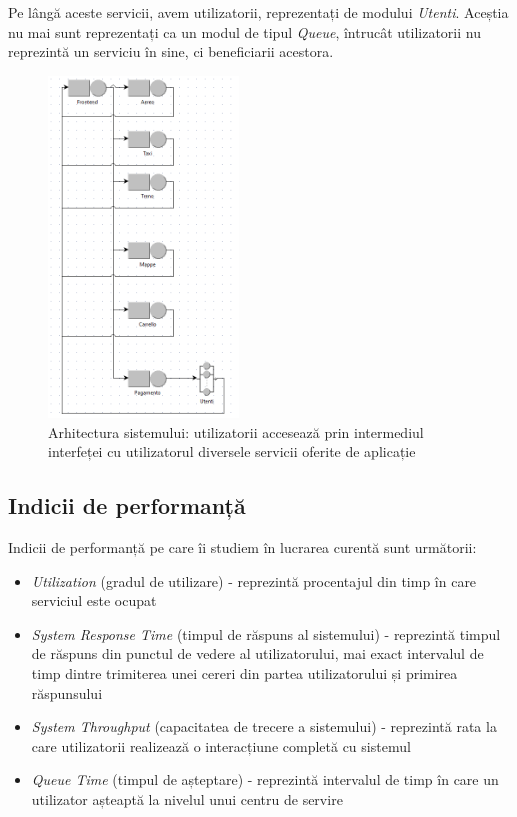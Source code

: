 \documentclass[12pt]{article}
\begin{document}
            Pe lângă aceste servicii, avem utilizatorii, reprezentați de modului \textit{Utenti}. Aceștia nu mai sunt reprezentați ca un modul de tipul \textit{Queue}, întrucât utilizatorii nu reprezintă un serviciu în sine, ci beneficiarii acestora.

            \begin{figure}[h!]
                \centering
                \includegraphics[width=0.45\textwidth]{images/architecture.png}
                \caption{Arhitectura sistemului: utilizatorii accesează prin intermediul interfeței cu utilizatorul diversele servicii oferite de aplicație}
            \end{figure}

        \subsection{Indicii de performanță}
            Indicii de performanță pe care îi studiem în lucrarea curentă sunt următorii:
            \begin{itemize}
                \item{\textit{Utilization} (gradul de utilizare) - reprezintă procentajul din timp în care serviciul este ocupat}
                \item{\textit{System Response Time} (timpul de răspuns al sistemului) - reprezintă timpul de răspuns din punctul de vedere al utilizatorului, mai exact intervalul de timp dintre trimiterea unei cereri din partea utilizatorului și primirea răspunsului}
                \item{\textit{System Throughput} (capacitatea de trecere a sistemului) - reprezintă rata la care utilizatorii realizează o interacțiune completă cu sistemul}
                \item{\textit{Queue Time} (timpul de așteptare) - reprezintă intervalul de timp în care un utilizator așteaptă la nivelul unui centru de servire}
            \end{itemize}
\end{document}

